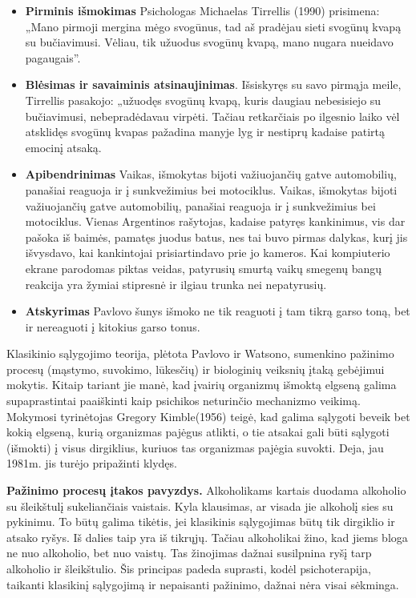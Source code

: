 \documentclass{article}
\begin{document}
\begin{itemize}
\item \textbf{Pirminis išmokimas} Psichologas Michaelas Tirrellis (1990) prisimena: „Mano pirmoji mergina mėgo svogūnus, tad aš pradėjau sieti svogūnų kvapą su bučiavimusi. Vėliau, tik užuodus svogūnų kvapą, mano nugara nueidavo pagaugais''.
\item \textbf{Blėsimas ir savaiminis atsinaujinimas}. Išsiskyręs su savo pirmąja meile, Tirrellis pasakojo: „užuodęs svogūnų kvapą, kuris daugiau nebesisiejo su bučiavimusi, nebepradėdavau virpėti. Tačiau retkarčiais po ilgesnio laiko vėl atsklidęs svogūnų kvapas pažadina manyje lyg ir nestiprų kadaise patirtą emocinį atsaką.
\item \textbf{Apibendrinimas} Vaikas, išmokytas bijoti važiuojančių gatve automobilių, panašiai reaguoja ir į sunkvežimius bei motociklus. Vaikas, išmokytas bijoti važiuojančių gatve automobilių, panašiai reaguoja ir į sunkvežimius bei motociklus. Vienas Argentinos rašytojas, kadaise patyręs kankinimus, vis dar pašoka iš baimės, pamatęs juodus batus, nes tai buvo pirmas dalykas, kurį jis išvysdavo, kai kankintojai prisiartindavo prie jo kameros. Kai kompiuterio ekrane parodomas piktas veidas, patyrusių smurtą vaikų smegenų bangų reakcija yra žymiai stipresnė ir ilgiau trunka nei nepatyrusių.
\item \textbf{Atskyrimas} Pavlovo šunys išmoko ne tik reaguoti į tam tikrą garso toną, bet ir nereaguoti į kitokius garso tonus.
\end{itemize}

Klasikinio sąlygojimo teorija, plėtota Pavlovo ir Watsono, sumenkino pažinimo procesų (mąstymo, suvokimo, lūkesčių) ir biologinių veiksnių įtaką gebėjimui mokytis. Kitaip tariant jie manė, kad įvairių organizmų išmoktą elgseną galima supaprastintai paaiškinti kaip psichikos neturinčio mechanizmo veikimą. Mokymosi tyrinėtojas Gregory Kimble(1956) teigė, kad galima sąlygoti beveik bet kokią elgseną, kurią organizmas pajėgus atlikti, o tie atsakai gali būti sąlygoti (išmokti) į visus dirgiklius, kuriuos tas organizmas pajėgia suvokti. Deja, jau 1981m. jis turėjo pripažinti klydęs. 

\textbf{Pažinimo procesų įtakos pavyzdys.} Alkoholikams kartais duodama alkoholio su šleikštulį sukeliančiais vaistais. Kyla klausimas, ar visada jie alkoholį sies su pykinimu. To būtų galima tikėtis, jei klasikinis sąlygojimas būtų tik dirgiklio ir atsako ryšys. Iš dalies taip yra iš tikrųjų. Tačiau alkoholikai žino, kad jiems bloga ne nuo alkoholio, bet nuo vaistų. Tas žinojimas dažnai susilpnina ryšį tarp alkoholio ir šleikštulio. Šis principas padeda suprasti, kodėl psichoterapija, taikanti klasikinį sąlygojimą ir nepaisanti pažinimo, dažnai nėra visai sėkminga.
\end{document}
